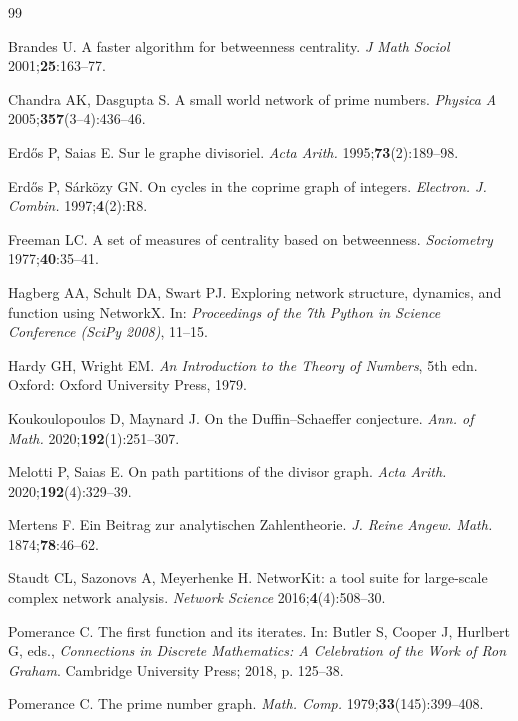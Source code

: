 \documentclass[11pt]{article}
\theoremstyle{plain}
\theoremstyle{definition}
\begin{document}
\begin{thebibliography}{99}

Brandes U. A faster algorithm for betweenness centrality.
\emph{J Math Sociol} 2001;\textbf{25}:163--77.

Chandra AK, Dasgupta S. A small world network of prime numbers.
\emph{Physica A} 2005;\textbf{357}(3--4):436--46.

Erd\H{o}s P, Saias E. Sur le graphe divisoriel.
\emph{Acta Arith.} 1995;\textbf{73}(2):189--98.

Erd\H{o}s P, S\'ark\"ozy GN. On cycles in the coprime graph of integers.
\emph{Electron. J. Combin.} 1997;\textbf{4}(2):R8.

Freeman LC. A set of measures of centrality based on betweenness.
\emph{Sociometry} 1977;\textbf{40}:35--41.

Hagberg AA, Schult DA, Swart PJ. Exploring network structure, dynamics, and function using NetworkX.
In: \emph{Proceedings of the 7th Python in Science Conference (SciPy 2008)}, 11--15.

Hardy GH, Wright EM. \emph{An Introduction to the Theory of Numbers},
5th edn. Oxford: Oxford University Press, 1979.

Koukoulopoulos D, Maynard J. On the Duffin--Schaeffer conjecture.
\emph{Ann. of Math.} 2020;\textbf{192}(1):251--307.

Melotti P, Saias E. On path partitions of the divisor graph.
\emph{Acta Arith.} 2020;\textbf{192}(4):329--39.

Mertens F. Ein Beitrag zur analytischen Zahlentheorie.
\emph{J. Reine Angew. Math.} 1874;\textbf{78}:46--62.

Staudt CL, Sazonovs A, Meyerhenke H. NetworKit: a tool suite for large-scale complex network analysis.
\emph{Network Science} 2016;\textbf{4}(4):508--30.

Pomerance C. The first function and its iterates.
In: Butler S, Cooper J, Hurlbert G, eds., \emph{Connections in Discrete Mathematics: A Celebration of the Work of Ron Graham}.
Cambridge University Press; 2018, p. 125--38.

Pomerance C. The prime number graph.
\emph{Math. Comp.} 1979;\textbf{33}(145):399--408.


\end{thebibliography}
\end{document}

